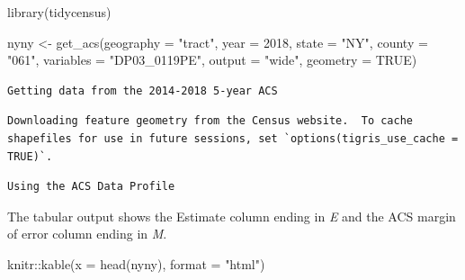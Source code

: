 \documentclass[
  letterpaper,
  DIV=11,
  numbers=noendperiod]{scrreprt}
\newenvironment{Shaded}{\begin{snugshade}}{\end{snugshade}}
\newcommand{\AttributeTok}[1]{\textcolor[rgb]{0.40,0.45,0.13}{#1}}
\newcommand{\ConstantTok}[1]{\textcolor[rgb]{0.56,0.35,0.01}{#1}}
\newcommand{\DecValTok}[1]{\textcolor[rgb]{0.68,0.00,0.00}{#1}}
\newcommand{\FunctionTok}[1]{\textcolor[rgb]{0.28,0.35,0.67}{#1}}
\newcommand{\NormalTok}[1]{\textcolor[rgb]{0.00,0.23,0.31}{#1}}
\newcommand{\OtherTok}[1]{\textcolor[rgb]{0.00,0.23,0.31}{#1}}
\newcommand{\SpecialCharTok}[1]{\textcolor[rgb]{0.37,0.37,0.37}{#1}}
\newcommand{\StringTok}[1]{\textcolor[rgb]{0.13,0.47,0.30}{#1}}
\begin{document}
\begin{Shaded}
\begin{Highlighting}[]
\FunctionTok{library}\NormalTok{(tidycensus)}

\NormalTok{nyny }\OtherTok{\textless{}{-}} \FunctionTok{get\_acs}\NormalTok{(}\AttributeTok{geography =} \StringTok{"tract"}\NormalTok{,}
                \AttributeTok{year =} \DecValTok{2018}\NormalTok{,}
                \AttributeTok{state =} \StringTok{"NY"}\NormalTok{,}
                \AttributeTok{county =} \StringTok{"061"}\NormalTok{,}
                \AttributeTok{variables =} \StringTok{"DP03\_0119PE"}\NormalTok{, }
                \AttributeTok{output =} \StringTok{"wide"}\NormalTok{,}
                \AttributeTok{geometry =} \ConstantTok{TRUE}\NormalTok{)}
\end{Highlighting}
\end{Shaded}

\begin{verbatim}
Getting data from the 2014-2018 5-year ACS
\end{verbatim}

\begin{verbatim}
Downloading feature geometry from the Census website.  To cache shapefiles for use in future sessions, set `options(tigris_use_cache = TRUE)`.
\end{verbatim}

\begin{verbatim}
Using the ACS Data Profile
\end{verbatim}

The tabular output shows the Estimate column ending in \emph{E} and the
ACS margin of error column ending in \emph{M}.

\begin{Shaded}
\begin{Highlighting}[]
\NormalTok{knitr}\SpecialCharTok{::}\FunctionTok{kable}\NormalTok{(}\AttributeTok{x =} \FunctionTok{head}\NormalTok{(nyny),}
             \AttributeTok{format =} \StringTok{"html"}\NormalTok{)}
\end{Highlighting}
\end{Shaded}
\end{document}
